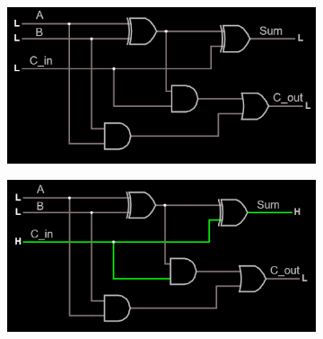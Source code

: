 \documentclass{article}
\begin{document}
	\begin{figure}[H]
		\centering
		\begin{subfigure}[t]{0.4\textwidth}
			\centering
			\includegraphics[width=\textwidth]{full_adder/full_adder_000.png}
		\end{subfigure}
		\begin{subfigure}[t]{.4\textwidth}
			\centering
			\includegraphics[width=\textwidth]{full_adder/full_adder_001.png}
		\end{subfigure}
		

\end{figure}
\end{document}
